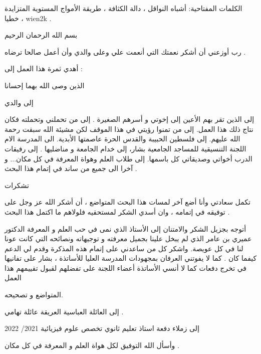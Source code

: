 الكلمات المفتاحية:
أشباه النواقل ، دالة الكثافة ، طريقة الأمواج المستوية المتزايدة خطيا ، wien2k .

بسم الله الرحمان الرحيم

رب أوزعني أن أشكر نعمتك التي أنعمت علي وعلى والدي وأن أعمل صالحا ترضاه .

أهدي ثمرة هذا العمل إلى :

الذين وصى الله بهما إحسانا

إلى والدي

إلى الذين تقر بهم الأعين 
إلى إخوتي و أسرهم الصغيرة .
إلى من تحملني وتحملته فكان نتاج ذلك هذا العمل.
إلى من تمنوا رؤيتي في هذا الموقف لكن مشيئة الله سبقت رحمة الله عليهم. 
إلى فلسطين الحبيبة والقدس الحرة عاصمتها الأبدية. 
الى المدرسة الام اللجنة التنسيقية للمساجد الجامعية بشار، إلى خدام الجامعة و مناضليها .
إلى رفيقات الدرب أخواتي وصديقاتي كل باسمها. 
إلى طلاب العلم وهواة المعرفة في كل مكان...
و آخرا الى جميع من ساند في إتمام هذا البحث .


تشكرات

تكمل سعادتي وأنا أضع آخر لمسات هذا البحث المتواضع ، أن أشكر الله عز وجل على توفيقه في إتمامه ، وان أسدي الشكر لمستحقيه فلولاهم ما اكتمل هذا البحث .

أتوجه بجزيل الشكر والامتنان إلى الأستاذ الذي نمى في حب العلم و المعرفة الدكتور عميري بن عامر الذي لم يبخل علينا بجميل معرفته و توجيهاته ونصائحه  التي كانت عونا لنا في كل عويصة.
واشكر كل من ساعدني على إتمام هذه المذكرة وقدم لي الدعم كيفما كان .
كما لا يفوتني العرفان بمجهودات المدرسة العليا للأساتذة ، بشار على تفانيها في تخرج دفعات
كما لا أنسي الأساتذة أعضاء اللجنة على تفضلهم لقبول تقييمهم هذا العمل

المتواضع و تصحيحه.

إلى العائلة العباسية العريقة عائلة تهامي .

إلى زملاء دفعة استاذ تعليم ثانوي تخصص علوم فيزيائية  2021/ 2022

وأسأل الله التوفيق لكل هواة العلم و المعرفة في كل مكان .